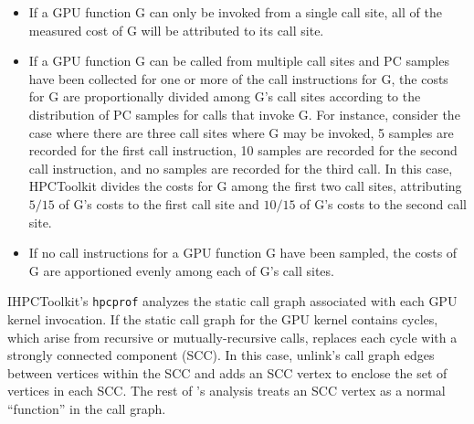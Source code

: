 \begin{itemize}
\item
If a GPU function G can only be invoked from a single call site, all of the measured cost of G will be attributed to its call site. 
\item
If a GPU function G can be called from multiple call sites and PC samples have been collected for one or more of the call instructions for G, the costs for G are proportionally divided among G's call sites according to the distribution of PC samples for calls that invoke G.  For instance, consider the case where there are three call sites where G may be invoked, 5 samples are recorded for the first call instruction, 10 samples are recorded for the second call instruction, and no samples are recorded for the third call. In this case, HPCToolkit divides the costs for G  among the first two call sites, attributing $5/15$ of G's costs  to the first call site and $10/15$ of G's costs to the second call site. 
\item
If no call instructions for a GPU function G have been sampled, the costs of G are apportioned evenly among each of G's call sites.
\end{itemize}

IHPCToolkit's {\tt hpcprof} analyzes the static call graph associated with each GPU kernel invocation. If the static call graph for the GPU kernel contains cycles, which arise from recursive or mutually-recursive calls,  \hpcprof{} replaces each cycle with a strongly connected component (SCC). In this case, \hpcprof{} unlink's call graph edges between vertices within the SCC and adds an SCC vertex to enclose the set of vertices in each SCC. The rest of \hpcprof{}'s analysis 
treats an SCC vertex as a normal ``function'' in the call graph.

